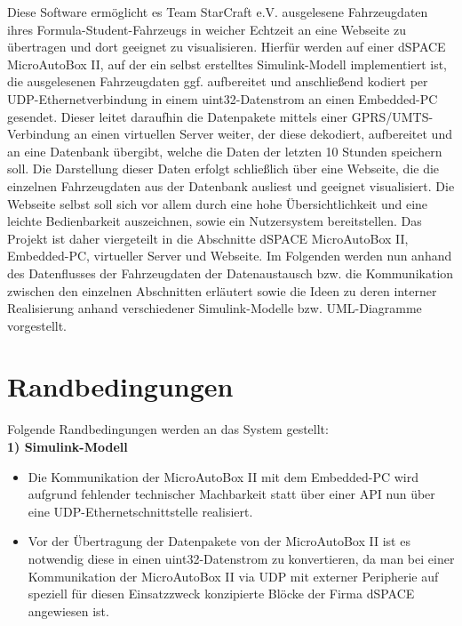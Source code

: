 \documentclass[fontsize = 12pt, paper = a4]{scrreprt}
\begin{document}
Diese Software ermöglicht es Team StarCraft e.V. ausgelesene Fahrzeugdaten ihres Formula-Student-Fahrzeugs in weicher Echtzeit an eine Webseite zu übertragen und dort geeignet zu visualisieren. Hierfür werden auf einer dSPACE MicroAutoBox II, auf der ein selbst erstelltes Simulink-Modell implementiert ist, die ausgelesenen Fahrzeugdaten ggf. auf\-be\-reitet und anschließend kodiert per UDP-Ethernetverbindung in einem uint32-Datenstrom an einen Embedded-PC gesendet. Dieser leitet daraufhin die Datenpakete mittels einer GPRS/UMTS-Verbindung an einen virtuellen Server weiter, der diese dekodiert, aufbereitet und an eine Datenbank übergibt, welche die Daten der letzten 10 Stunden speichern soll. Die Darstellung dieser Daten erfolgt schließlich über eine Webseite, die die einzelnen Fahrzeugdaten aus der Datenbank ausliest und geeignet visualisiert. Die Webseite selbst soll sich vor allem durch eine hohe Übersichtlichkeit und eine leichte Bedienbarkeit auszeichnen, sowie ein Nutzersystem bereitstellen. Das Projekt ist daher viergeteilt in die Abschnitte dSPACE MicroAutoBox II, Embedded-PC, virtueller Server und Webseite. Im Folgenden werden nun anhand des Datenflusses der Fahrzeugdaten der Datenaustausch bzw. die Kommunikation zwischen den einzelnen Abschnitten erläutert sowie die Ideen zu deren interner Realisierung anhand verschiedener Simulink-Modelle bzw. UML-Diagramme vorgestellt.


\chapter{Randbedingungen} 

Folgende Randbedingungen werden an das System gestellt: \\

\textbf{1) Simulink-Modell} 

\begin{itemize}

\item Die Kommunikation der MicroAutoBox II mit dem Embedded-PC wird aufgrund fehlender technischer Machbarkeit statt über einer API nun über eine UDP-Ethernet\-schnittstelle realisiert.


\item Vor der Übertragung der Datenpakete von der MicroAutoBox II ist es notwendig diese in einen uint32-Datenstrom zu konvertieren, da man bei einer Kommunikation der MicroAutoBox II via UDP mit externer Peripherie auf speziell für diesen Einsatzzweck konzipierte Blöcke der Firma dSPACE angewiesen ist. \\

\end{itemize}
\end{document}
